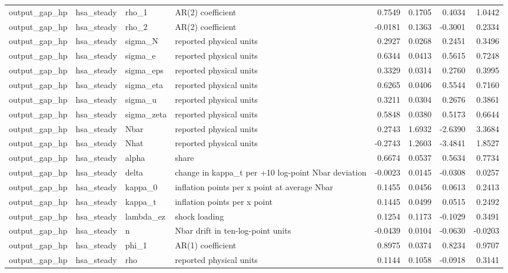\begin{tabular}{llllrrrr}
output\_gap\_hp & hsa\_steady & rho\_1 & AR(2) coefficient & 0.7549 & 0.1705 & 0.4034 & 1.0442 \\
output\_gap\_hp & hsa\_steady & rho\_2 & AR(2) coefficient & -0.0181 & 0.1363 & -0.3001 & 0.2334 \\
output\_gap\_hp & hsa\_steady & sigma\_N & reported physical units & 0.2927 & 0.0268 & 0.2451 & 0.3496 \\
output\_gap\_hp & hsa\_steady & sigma\_e & reported physical units & 0.6344 & 0.0413 & 0.5615 & 0.7248 \\
output\_gap\_hp & hsa\_steady & sigma\_eps & reported physical units & 0.3329 & 0.0314 & 0.2760 & 0.3995 \\
output\_gap\_hp & hsa\_steady & sigma\_eta & reported physical units & 0.6265 & 0.0406 & 0.5544 & 0.7160 \\
output\_gap\_hp & hsa\_steady & sigma\_u & reported physical units & 0.3211 & 0.0304 & 0.2676 & 0.3861 \\
output\_gap\_hp & hsa\_steady & sigma\_zeta & reported physical units & 0.5848 & 0.0380 & 0.5173 & 0.6644 \\
output\_gap\_hp & hsa\_steady & Nbar & reported physical units & 0.2743 & 1.6932 & -2.6390 & 3.3684 \\
output\_gap\_hp & hsa\_steady & Nhat & reported physical units & -0.2743 & 1.2603 & -3.4841 & 1.8527 \\
output\_gap\_hp & hsa\_steady & alpha & share & 0.6674 & 0.0537 & 0.5634 & 0.7734 \\
output\_gap\_hp & hsa\_steady & delta & change in kappa\_t per +10 log-point Nbar deviation & -0.0023 & 0.0145 & -0.0308 & 0.0257 \\
output\_gap\_hp & hsa\_steady & kappa\_0 & inflation points per x point at average Nbar & 0.1455 & 0.0456 & 0.0613 & 0.2413 \\
output\_gap\_hp & hsa\_steady & kappa\_t & inflation points per x point & 0.1445 & 0.0499 & 0.0515 & 0.2492 \\
output\_gap\_hp & hsa\_steady & lambda\_ez & shock loading & 0.1254 & 0.1173 & -0.1029 & 0.3491 \\
output\_gap\_hp & hsa\_steady & n & Nbar drift in ten-log-point units & -0.0439 & 0.0104 & -0.0630 & -0.0203 \\
output\_gap\_hp & hsa\_steady & phi\_1 & AR(1) coefficient & 0.8975 & 0.0374 & 0.8234 & 0.9707 \\
output\_gap\_hp & hsa\_steady & rho & reported physical units & 0.1144 & 0.1058 & -0.0918 & 0.3141 \\

\end{tabular}
